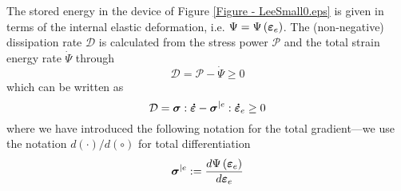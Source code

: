 \documentclass[preprint,review,12pt,sort&compress]{elsarticle}%
\renewcommand{\mathbf}[1]{\mbox{\boldmath $#1$ \unboldmath}  \!\!}
\begin{document}
The stored energy in the device of Figure \ref{Figure - LeeSmall0.eps} is
given in terms of the internal elastic deformation, i.e. $\Psi=\Psi\left(
\mathbf{\varepsilon}_{e}\right)  $. The (non-negative) dissipation rate
$\mathcal{D}$ is calculated from the stress power $\mathcal{P}$ and the total
strain energy rate $\dot{\Psi}$ through%
\begin{equation}
\mathcal{D}=\mathcal{P}-\dot{\Psi}\geq0
\end{equation}
which can be written as%
\begin{equation}
\mathcal{D}=\mathbf{\sigma}:\mathbf{\dot{\varepsilon}}-\mathbf{\sigma}%
^{|e}:\mathbf{\dot{\varepsilon}}_{e}\geq0 \label{Dissipationeps}%
\end{equation}
where we have introduced the following notation for the total gradient---we
use the notation $d\left(  \cdot\right)  /d(\circ)$ for total differentiation%
\begin{equation}
\mathbf{\sigma}^{|e}:=\frac{d\Psi\left(  \mathbf{\varepsilon}_{e}\right)
}{d\mathbf{\varepsilon}_{e}} \label{sigext and sigint}%
\end{equation}
\end{document}
